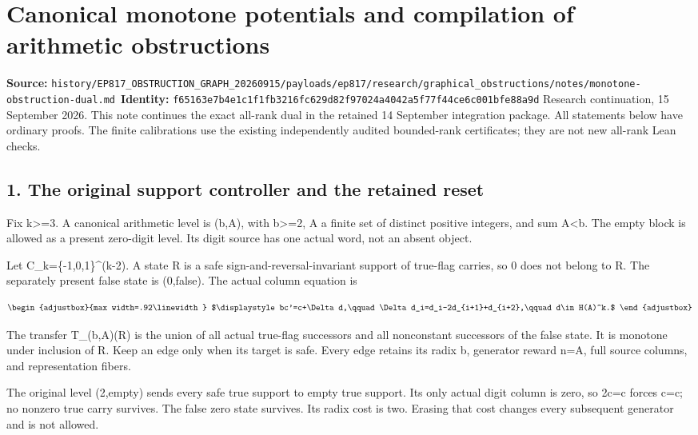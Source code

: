 \chapter{Canonical monotone potentials and compilation of arithmetic obstructions}
\label{chapter:09_monotone-obstruction-dual}
{\small\noindent\textbf{Source:} \nolinkurl{history/EP817_OBSTRUCTION_GRAPH_20260915/payloads/ep817/research/graphical_obstructions/notes/monotone-obstruction-dual.md}\
\textbf{Identity:} \nolinkurl{f65163e7b4e1c1f1fb3216fc629d82f97024a4042a5f77f44ce6c001bfe88a9d}}
\medskip
Research continuation, 15 September 2026. This note continues the exact all-rank dual in the retained 14 September integration package. All statements below have ordinary proofs. The finite calibrations use the existing independently audited bounded-rank certificates; they are not new all-rank Lean checks.

\section{1. The original support controller and the retained reset}\label{n09-the-original-support-controller-and-the-retained-reset}

Fix k\textgreater=3. A canonical arithmetic level is (b,A), with b\textgreater=2, A a finite set of distinct positive integers, and sum A\textless b. The empty block is allowed as a present zero-digit level. Its digit source has one actual word, not an absent object.

Let C\_k=\{-1,0,1\}\^{}(k-2). A state R is a safe sign-and-reversal-invariant support of true-flag carries, so 0 does not belong to R. The separately present false state is (0,false). The actual column equation is

\[
\begin{adjustbox}{max width=.92\linewidth}
$\displaystyle bc'=c+\Delta d,\qquad \Delta d_i=d_i-2d_{i+1}+d_{i+2},\qquad d\in H(A)^k.$
\end{adjustbox}
\]

The transfer T\_(b,A)(R) is the union of all actual true-flag successors and all nonconstant successors of the false state. It is monotone under inclusion of R. Keep an edge only when its target is safe. Every edge retains its radix b, generator reward n=\textbar A\textbar, full source columns, and representation fibers.

The original level (2,empty) sends every safe true support to empty true support. Its only actual digit column is zero, so 2c\textquotesingle=c forces c=c; no nonzero true carry survives. The false zero state survives. Its radix cost is two. Erasing that cost changes every subsequent generator and is not allowed.

